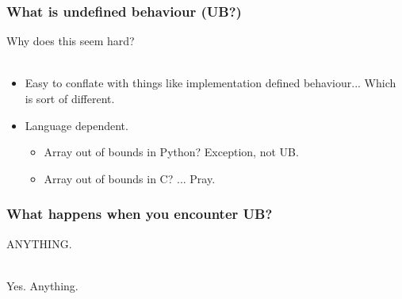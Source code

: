 \documentclass{beamer}
\begin{document}
\begin{frame}
  \frametitle{What is undefined behaviour (UB?)}

  Why does this seem hard?\\~

  \pause
  \begin{itemize}
\item Easy to conflate with things like implementation defined
  behaviour... Which is sort of different.
  \pause
\item Language dependent.
  \begin{itemize}
  \item  Array out of bounds in Python? Exception, not UB.
    \pause
  \item Array out of bounds in C? ... Pray.
  \end{itemize}
  \end{itemize}
\end{frame}

\begin{frame}
  \frametitle{What happens when you encounter UB?}

  \pause

  {\huge ANYTHING.}\\~

  \pause

  {\huge Yes. \pause Anything.}\\~
  
\end{frame}
\end{document}

